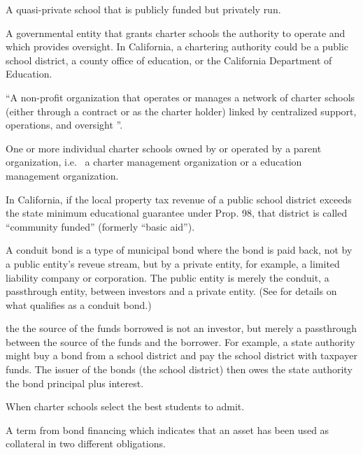 \begin{description}[nosep]
\medskip\item[charter school] A quasi-private school that is publicly funded but privately run.

\medskip\item[chartering authority] A governmental entity that grants charter schools the authority to operate and which provides oversight. In California, a chartering authority could be a public school district, a county office of education, or the California Department of Education.

\medskip\item[charter management organization (CMO)] ``A non-profit organization that operates or manages a network of charter schools (either through a contract or as the charter holder) linked by centralized support, operations, and oversight \parencite{CDE2023}''.

\medskip\item[charter school chain] One or more individual charter schools owned by or operated by a parent organization, i.e.  a charter management organization or a education management organization.

\medskip\item[community funded] In California, if the local property tax revenue of a public school district exceeds the state minimum educational guarantee under Prop. 98, that district is called ``community funded'' (formerly ``basic aid'').

\medskip\item[conduit bond] A conduit bond is a type of municipal bond where the bond is paid back, not by a public entity's reveue stream, but by a private entity, for example, a limited liability company or corporation. The public entity is merely the conduit, a passthrough entity, between investors and a private entity. (See \textcite{GASB91_2019} for details on what qualifies as a conduit bond.) %

the the source of the funds borrowed is not an investor, but merely a passthrough between the source of the funds and the borrower. For example, a state authority might buy a bond from a school district and pay the school district with taxpayer funds. The issuer of the bonds (the school district) then owes the state authority the bond principal plus interest.

\medskip\item[cream skimming] When charter schools select the best students to admit.

\medskip\item[cross-collateralization] A term from bond financing which indicates that an asset has been used as collateral in two different obligations.


\end{description}
